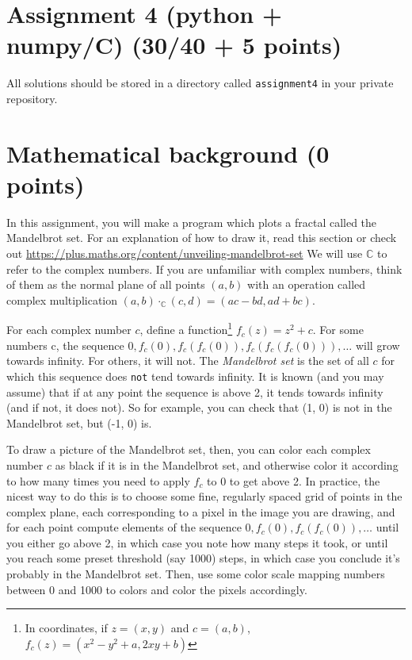 \documentclass[english]{article}
\begin{document}
\newcommand{\Ci}{ \mathbb{C} }
\newcommand{\C}{ $\Ci$ }

{\lstset{language=bash, showstringspaces=false}}
{}

{\lstset{language=python, showstringspaces=false}}
{}


\section{Assignment 4 (python + numpy/C) (30/40 + 5 points)}
All solutions should be stored in a directory called \texttt{assignment4} in your private repository.

\section{Mathematical background (0 points)}
In this assignment, you will make a program which plots a fractal called the Mandelbrot set. For an explanation of how to draw it, read this section or check out \url{https://plus.maths.org/content/unveiling-mandelbrot-set} We will use \C to refer to the complex numbers. If you are unfamiliar with complex numbers, think of them as the normal plane of all points $(a, b)$ with an operation called complex multiplication $(a, b) \cdot_{\Ci} (c, d) = (ac - bd, ad + bc)$.

For each complex number $c$, define a function\footnote{In coordinates, if $z=(x, y)$ and $c=(a, b)$, $f_c(z) = ( x^2 - y^2 + a, 2xy + b)$} $f_c(z) = z^2 + c$. For some numbers c, the sequence $0, f_c(0), f_c(f_c(0)), f_c(f_c(f_c(0))), \ldots $ will grow towards infinity. For others, it will not. The \emph{Mandelbrot set} is the set of all $c$ for which this sequence does \texttt{not} tend towards infinity. It is known (and you may assume) that if at any point the sequence is above 2, it tends towards infinity (and if not, it does not). So for example, you can check that (1, 0) is not in the Mandelbrot set, but (-1, 0) is. 

To draw a picture of the Mandelbrot set, then, you can color each complex number $c$ as black if it is in the Mandelbrot set, and otherwise color it according to how many times you need to apply $f_c$ to 0 to get above 2. In practice, the nicest way to do this is to choose some fine, regularly spaced grid of points in the complex plane, each corresponding to a pixel in the image you are drawing, and for each point compute elements of the sequence $0, f_c(0), f_c(f_c(0)), \ldots$ until you either go above 2, in which case you note how many steps it took, or until you reach some preset threshold (say 1000) steps, in which case you conclude it's probably in the Mandelbrot set. Then, use some color scale mapping numbers between 0 and 1000 to colors and color the pixels accordingly. 
\end{document}
